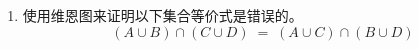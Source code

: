 \begin{enumerate}
    Now prove it!
    
    现在证明它！
     
     \wbvfill
     
     \workbookpagebreak
     
    \item 
    使用维恩图来证明以下集合等价式是错误的。
    \[ (A \cup B) \cap (C \cup D) \; = \; (A \cup C) \cap (B \cup D) \]
    
    
    \wbvfill
     
     \workbookpagebreak
     
    \end{enumerate}
    
    
    
